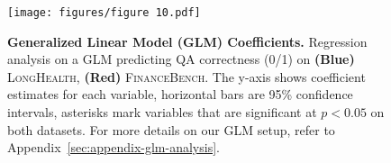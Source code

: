 \documentclass{article} %
\begin{document}



\begin{figure}[h]
    \centering
    \texttt{[image: figures/figure 10.pdf]}
    \caption{\textbf{Generalized Linear Model (GLM) Coefficients.} Regression analysis on a GLM predicting QA correctness (0/1) on \textbf{(Blue)} \textsc{LongHealth}, \textbf{(Red)} \textsc{FinanceBench}. The y-axis shows coefficient estimates for each variable, horizontal bars are 95\% confidence intervals, asterisks mark variables that are significant at $p < 0.05$ on both datasets. For more details on our GLM setup, refer to Appendix~\ref{sec:appendix-glm-analysis}.}
    \label{fig:figure-10-glm}
\end{figure}
\end{document}
